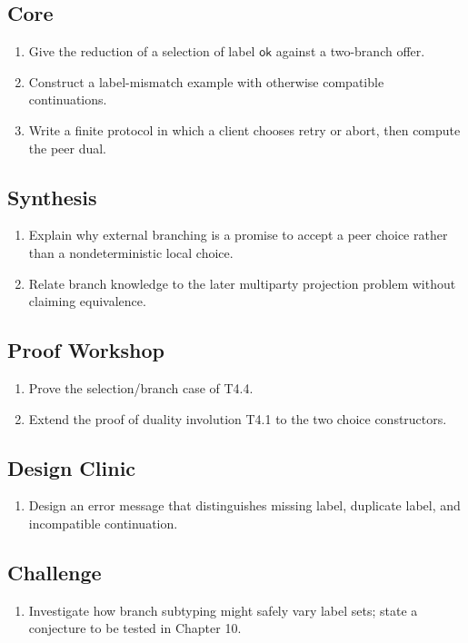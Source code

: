 \subsection*{Core}
\begin{enumerate}[label=\textbf{4.\arabic*},start=4]
\item Give the reduction of a selection of label $\mathsf{ok}$ against a two-branch offer.
\item Construct a label-mismatch example with otherwise compatible continuations.
\item Write a finite protocol in which a client chooses retry or abort, then compute the peer dual.
\end{enumerate}
\subsection*{Synthesis}
\begin{enumerate}[label=\textbf{4.\arabic*},start=7]
\item Explain why external branching is a promise to accept a peer choice rather than a nondeterministic local choice.
\item Relate branch knowledge to the later multiparty projection problem without claiming equivalence.
\end{enumerate}
\subsection*{Proof Workshop}
\begin{enumerate}[label=\textbf{4.\arabic*},start=9]
\item Prove the selection/branch case of T4.4.
\item Extend the proof of duality involution T4.1 to the two choice constructors.
\end{enumerate}
\subsection*{Design Clinic}
\begin{enumerate}[label=\textbf{4.\arabic*},start=11]
\item Design an error message that distinguishes missing label, duplicate label, and incompatible continuation.
\end{enumerate}
\subsection*{Challenge}
\begin{enumerate}[label=\textbf{4.\arabic*},start=12]
\item Investigate how branch subtyping might safely vary label sets; state a conjecture to be tested in Chapter 10.
\end{enumerate}
